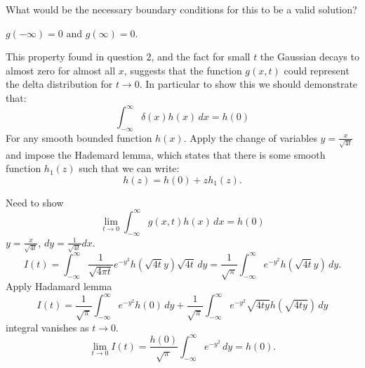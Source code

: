 \documentclass[10pt, a4paper]{article}
\begin{document}
\begin{problem}
    What would be the necessary boundary conditions for this to be a valid solution?

    \begin{solution}
        $g(-\infty) = 0$ and $g(\infty) = 0$.
    \end{solution}
\end{problem}

\begin{problem}
    This property found in question $2$,
    and the fact for small $t$ the Gaussian decays to almost zero for almost all $x$,
    suggests that the function $g(x, t)$ could represent the delta distribution for $t \to 0$.
    In particular to show this we should demonstrate that:
    \[
    \int_{-\infty}^{\infty}\delta(x)h(x)\,dx = h(0)
    \]
    For any smooth bounded function $h(x)$.
    Apply the change of variables $y = \frac{x}{\sqrt{4t}}$ and impose the Hademard lemma,
    which states that there is some smooth function $h_1(z)$ such that we can write:
    \[
    h(z) = h(0) + zh_1(z).
    \]

    \begin{solution}
        Need to show
        \[
        \lim_{t \to 0}\int_{-\infty}^{\infty}g(x, t)h(x)\,dx = h(0)
        \]
        $y = \frac{x}{\sqrt{4t}}$,
        $dy = \frac{1}{\sqrt{4t}}dx$.
        \[
        I(t) = \int_{-\infty}^{\infty}\frac{1}{\sqrt{4\pi t}}e ^ {-y ^ 2}h(\sqrt{4t}y)\sqrt{4t}\,dy = \frac{1}{\sqrt{\pi}}\int_{-\infty}^{\infty}e ^ {-y ^ 2}h(\sqrt{4t}y)\,dy.
        \]
        Apply Hadamard lemma
        \[
        I(t) = \frac{1}{\sqrt{\pi}}\int_{-\infty}^{\infty}e ^ {-y ^ 2}h(0)\,dy + \frac{1}{\sqrt{\pi}}\int_{-\infty}^{\infty}e ^ {-y ^ 2}\sqrt{4ty}h(\sqrt{4ty})\,dy
        \]
        integral vanishes as $t \to 0$.
        \[
        \lim_{t \to 0}I(t) = \frac{h(0)}{\sqrt{\pi}}\int_{-\infty}^{\infty}e ^ {-y ^ 2}\,dy = h(0).
        \]
    \end{solution}
\end{problem}
\end{document}
